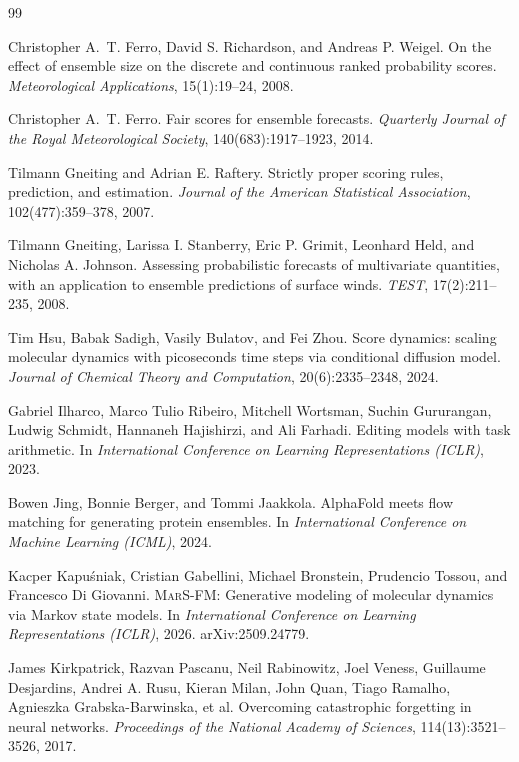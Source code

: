 \documentclass{article}
\newcommand{\marsfm}{\textsc{MarS-FM}}
\begin{document}

\begin{thebibliography}{99}

Christopher A.~T. Ferro, David S. Richardson, and Andreas P. Weigel.
On the effect of ensemble size on the discrete and continuous ranked probability scores.
\emph{Meteorological Applications}, 15(1):19--24, 2008.

Christopher A.~T. Ferro.
Fair scores for ensemble forecasts.
\emph{Quarterly Journal of the Royal Meteorological Society}, 140(683):1917--1923, 2014.

Tilmann Gneiting and Adrian E. Raftery.
Strictly proper scoring rules, prediction, and estimation.
\emph{Journal of the American Statistical Association}, 102(477):359--378, 2007.

Tilmann Gneiting, Larissa I. Stanberry, Eric P. Grimit, Leonhard Held, and Nicholas A. Johnson.
Assessing probabilistic forecasts of multivariate quantities, with an application to ensemble predictions of surface winds.
\emph{TEST}, 17(2):211--235, 2008.

Tim Hsu, Babak Sadigh, Vasily Bulatov, and Fei Zhou.
Score dynamics: scaling molecular dynamics with picoseconds time steps via conditional diffusion model.
\emph{Journal of Chemical Theory and Computation}, 20(6):2335--2348, 2024.

Gabriel Ilharco, Marco Tulio Ribeiro, Mitchell Wortsman, Suchin Gururangan, Ludwig Schmidt, Hannaneh Hajishirzi, and Ali Farhadi.
Editing models with task arithmetic.
In \emph{International Conference on Learning Representations (ICLR)}, 2023.

Bowen Jing, Bonnie Berger, and Tommi Jaakkola.
AlphaFold meets flow matching for generating protein ensembles.
In \emph{International Conference on Machine Learning (ICML)}, 2024.

Kacper Kapu\'{s}niak, Cristian Gabellini, Michael Bronstein, Prudencio Tossou, and Francesco Di Giovanni.
\marsfm{}: Generative modeling of molecular dynamics via Markov state models.
In \emph{International Conference on Learning Representations (ICLR)}, 2026.
arXiv:2509.24779.

James Kirkpatrick, Razvan Pascanu, Neil Rabinowitz, Joel Veness, Guillaume Desjardins, Andrei A. Rusu, Kieran Milan, John Quan, Tiago Ramalho, Agnieszka Grabska-Barwinska, et al.
Overcoming catastrophic forgetting in neural networks.
\emph{Proceedings of the National Academy of Sciences}, 114(13):3521--3526, 2017.


\end{thebibliography}
\end{document}
